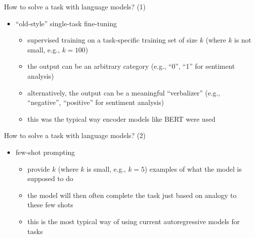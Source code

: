 \begin{frame}{How to solve a task with language models? (1)}

\vfill

\begin{itemize}
    \item ``old-style'' single-task fine-tuning 
        \begin{itemize}
            \item supervised training on a task-specific
        training set of size $k$ (where $k$ is not small,
        e.g., $k=100$)
        \item the output can be an arbitrary category (e.g.,
        ``0'', ``1'' for sentiment analysis)
            \item alternatively, the output can be a
        meaningful ``verbalizer'' (e.g., ``negative'',
        ``positive'' for sentiment analysis)
        \item this was the typical way encoder models like
        BERT were used
        \end{itemize}
\end{itemize}

\vfill

\end{frame}
\begin{frame}{How to solve a task with language models? (2)}

\vfill

\begin{itemize}
    \item few-shot prompting
        \begin{itemize}
            \item provide $k$ (where $k$ is small, e.g., $k=5$) examples of what the model is
supposed to do
        \item the model will then often complete the task
        just based on analogy to these few shots
        \item this is the most typical way of using current
        autoregressive models for tasks
        \end{itemize}
\end{itemize}

\vfill

\end{frame}
